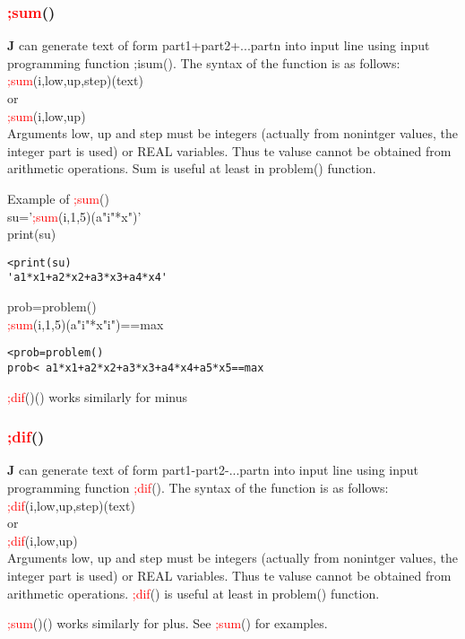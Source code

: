 \subsubsection{\textcolor{Red}{;sum}()}
\label{inpusum}
\textbf{J} can generate text of form part1+part2+...partn into input line using
input programming function ;isum(). The syntax of the function is as follows:\\
\textcolor{Red}{;sum}(i,low,up,step)(text)\\
or \\
\textcolor{Red}{;sum}(i,low,up)\\
Arguments low, up and step must be integers (actually from nonintger values, the
integer part is used) or REAL variables. Thus te valuse cannot be obtained
from arithmetic operations. Sum is useful at least in \textcolor{VioletRed}{problem}() function.
\begin{example}[inpusumex]Example of \textcolor{Red}{;sum}()\\
\label{inpusumex}
su='\textcolor{Red}{;sum}(i,1,5)(a"i"*x")'\\
\textcolor{VioletRed}{print}(su)
\color{Green}
\begin{verbatim}
<print(su)
'a1*x1+a2*x2+a3*x3+a4*x4'
\end{verbatim}
\color{Black}
prob=\textcolor{VioletRed}{problem}()\\
\textcolor{Red}{;sum}(i,1,5)(a"i"*x"i")==max
\color{Green}
\begin{verbatim}
<prob=problem()
prob< a1*x1+a2*x2+a3*x3+a4*x4+a5*x5==max
\end{verbatim}
\color{Black}
\end{example}
\begin{note}
\textcolor{Red}{;dif}()() works similarly for minus
\end{note}
\subsubsection{\textcolor{Red}{;dif}()}
\label{inpudif}
\textbf{J} can generate text of form part1-part2-...partn into input line using
input programming function \textcolor{Red}{;dif}(). The syntax of the function is as follows:\\
\textcolor{Red}{;dif}(i,low,up,step)(text)\\
or \\
\textcolor{Red}{;dif}(i,low,up)\\
Arguments low, up and step must be integers (actually from nonintger values, the
integer part is used) or REAL variables. Thus te valuse cannot be obtained
from arithmetic operations. \textcolor{Red}{;dif}() is useful at least in \textcolor{VioletRed}{problem}() function.
\begin{note}
\textcolor{Red}{;sum}()() works similarly for plus. See \textcolor{Red}{;sum}() for examples.
\end{note}
